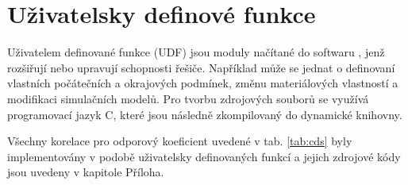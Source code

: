 \section{Uživatelsky definové funkce}
Uživatelem definované funkce (UDF) jsou moduly načítané do softwaru \flu, jenž rozšiřují nebo upravují schopnosti řešiče. Například může se jednat o definovaní vlastních počátečních a okrajových podmínek, změnu materiálových vlastností a modifikaci simulačních modelů. Pro tvorbu zdrojových souborů se využívá programovací jazyk C, které jsou následně zkompilovaný do dynamické knihovny.

Všechny korelace pro odporový koeficient uvedené v tab. \ref{tab:cds} byly implementovány v podobě uživatelsky definovaných funkcí a jejich zdrojové kódy jsou uvedeny v kapitole Příloha.

